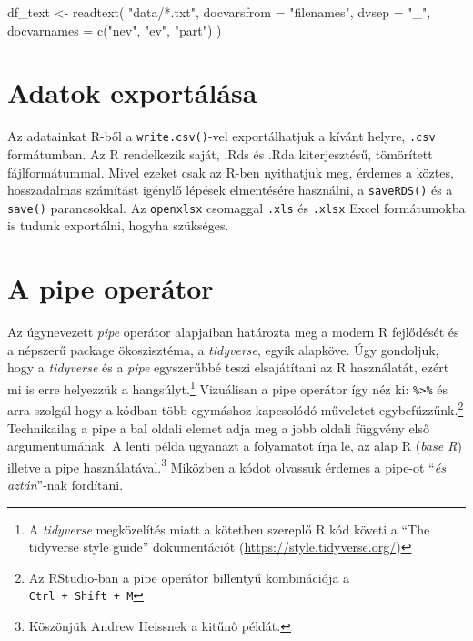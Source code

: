 \documentclass[
]{book}
\newenvironment{Shaded}{\begin{snugshade}}{\end{snugshade}}
\newcommand{\AttributeTok}[1]{\textcolor[rgb]{0.77,0.63,0.00}{#1}}
\newcommand{\FunctionTok}[1]{\textcolor[rgb]{0.00,0.00,0.00}{#1}}
\newcommand{\NormalTok}[1]{#1}
\newcommand{\OtherTok}[1]{\textcolor[rgb]{0.56,0.35,0.01}{#1}}
\newcommand{\StringTok}[1]{\textcolor[rgb]{0.31,0.60,0.02}{#1}}
\begin{document}
\begin{Shaded}
\begin{Highlighting}[]
\NormalTok{df\_text }\OtherTok{\textless{}{-}} \FunctionTok{readtext}\NormalTok{(}
  \StringTok{"data/*.txt"}\NormalTok{, }
  \AttributeTok{docvarsfrom =} \StringTok{"filenames"}\NormalTok{, }
  \AttributeTok{dvsep =} \StringTok{"\_"}\NormalTok{,}
  \AttributeTok{docvarnames =} \FunctionTok{c}\NormalTok{(}\StringTok{"nev"}\NormalTok{, }\StringTok{"ev"}\NormalTok{, }\StringTok{"part"}\NormalTok{)}
\NormalTok{  )}
\end{Highlighting}
\end{Shaded}

\hypertarget{adatok-exportuxe1luxe1sa}{%
\section{Adatok exportálása}\label{adatok-exportuxe1luxe1sa}}

Az adatainkat R-ből a \texttt{write.csv()}-vel exportálhatjuk a kívánt
helyre, \texttt{.csv} formátumban. Az R rendelkezik saját, .Rds és .Rda
kiterjesztésű, tömörített fájlformátummal. Mivel ezeket csak az R-ben
nyithatjuk meg, érdemes a köztes, hosszadalmas számítást igénylő lépések
elmentésére használni, a \texttt{saveRDS()} és a \texttt{save()}
parancsokkal. Az \texttt{openxlsx} csomaggal \texttt{.xls} és
\texttt{.xlsx} Excel formátumokba is tudunk exportálni, hogyha
szükséges.

\hypertarget{a-pipe-operuxe1tor}{%
\section{A pipe operátor}\label{a-pipe-operuxe1tor}}

Az úgynevezett \emph{pipe} operátor alapjaiban határozta meg a modern R
fejlődését és a népszerű package ökoszisztéma, a \emph{tidyverse}, egyik
alapköve. Úgy gondoljuk, hogy a \emph{tidyverse} és a \emph{pipe}
egyszerűbbé teszi elsajátítani az R használatát, ezért mi is erre
helyezzük a hangsúlyt.\footnote{A \emph{tidyverse} megközelítés miatt a
  kötetben szereplő R kód követi a ``The tidyverse style guide''
  dokumentációt (\url{https://style.tidyverse.org/})} Vizuálisan a pipe
operátor így néz ki: \texttt{\%\textgreater{}\%} és arra szolgál hogy a
kódban több egymáshoz kapcsolódó műveletet egybefűzzűnk.\footnote{Az
  RStudio-ban a pipe operátor billentyű kombinációja a
  \texttt{Ctrl\ +\ Shift\ +\ M}} Technikailag a pipe a bal oldali elemet
adja meg a jobb oldali függvény első argumentumának. A lenti példa
ugyanazt a folyamatot írja le, az alap R (\emph{base R}) illetve a pipe
használatával.\footnote{Köszönjük Andrew Heissnek a kitűnő példát.}
Miközben a kódot olvassuk érdemes a pipe-ot ``\emph{és aztán}''-nak
fordítani.
\end{document}
